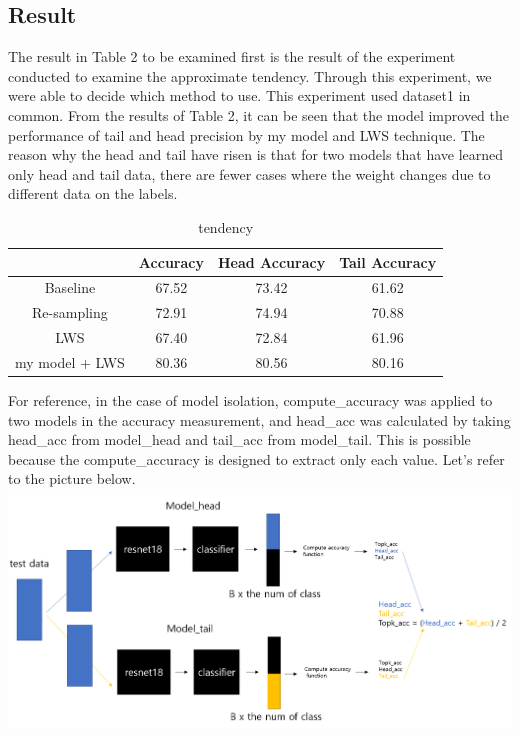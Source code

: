 \documentclass[extendedabs]{bmvc2k}
\begin{document}
  \subsection{Result}
  \quad The result in Table 2 to be examined first is the result of the experiment conducted to examine the approximate tendency.
  Through this experiment, we were able to decide which method to use. This experiment used dataset1 in common.
  From the results of Table 2, it can be seen that the model improved the performance of tail and head precision by my model and LWS technique. 
  The reason why the head and tail have risen is that for two models that have learned only head and tail data, there are fewer cases where the weight changes 
  due to different data on the labels.
  \begin{table}
    \centering
    \caption{tendency}
    \label{t1}
    \begin{tabular}{|c|c|c|c|}
    \noalign{\smallskip}\noalign{\smallskip}\hline
    & Accuracy & Head Accuracy & Tail Accuracy \\
    \hline
    Baseline & 67.52 & 73.42 & 61.62 \\
    \hline
    Re-sampling & 72.91 & 74.94 & 70.88 \\
    \hline
    LWS & 67.40 & 72.84 & 61.96 \\
    \hline
    my model + LWS & 80.36 & 80.56 & 80.16 \\
    \hline
    \end{tabular}
  \end{table}
  \newline
  \newline For reference, in the case of model isolation, compute\_accuracy was applied to two models in the accuracy measurement, and head\_acc was calculated 
  by taking head\_acc from model\_head and tail\_acc from model\_tail. This is possible because the compute\_accuracy is designed to extract only each value. 
  Let's refer to the picture below.
  \newline  \includegraphics[width=\linewidth]{images/12_project.PNG}
\end{document}
